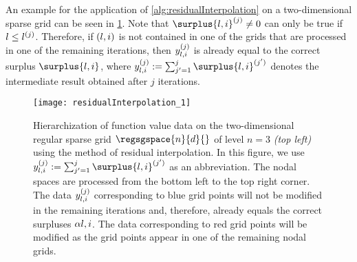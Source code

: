 An example for the application of \cref{alg:residualInterpolation}
on a two-dimensional sparse grid can be seen in
\cref{fig:residualInterpolation}.
Note that
$\surplus{\*l,\*i}^{(j)} \not= 0$ can only be true if $\*l \le \*l^{(j)}$.
Therefore, if $(\*l, \*i)$ is not contained in one of the
grids that are processed in one of the remaining iterations,
then $\linout{\*l,\*i}^{(j)}$ is already equal to the correct surplus
$\surplus{\*l,\*i}$,
where $\linout{\*l,\*i}^{(j)} := \sum_{j'=1}^j \surplus{\*l,\*i}^{(j')}$
denotes the intermediate result obtained after $j$ iterations.

\begin{SCfigure}
  \texttt{[image: residualInterpolation\_1]}%
  \caption[%
    Hierarchization with residual interpolation%
  ]{%
    Hierarchization of function value data on the
    two-dimensional regular sparse grid
    $\regsgspace{n}{d}{}$ of level $n = 3$ \emph{(top left)}
    using the method of residual interpolation.
    In this figure, we use
    $\linout{\*l,\*i}^{(j)} := \sum_{j'=1}^j \surplus{\*l,\*i}^{(j')}$
    as an abbreviation.
    The nodal spaces are processed from the bottom left to
    the top right corner.
    The data $\linout{\*l,\*i}^{(j)}$
    corresponding to \textcolor{C0}{blue grid points}
    will not be modified in the remaining iterations
    and, therefore, already equals the correct surpluses $\alpha{\*l,\*i}$.
    The data corresponding to \textcolor{C1}{red grid points}
    will be modified as the grid points appear in one of the remaining
    nodal grids.%
  }%
  \label{fig:residualInterpolation}%
\end{SCfigure}
